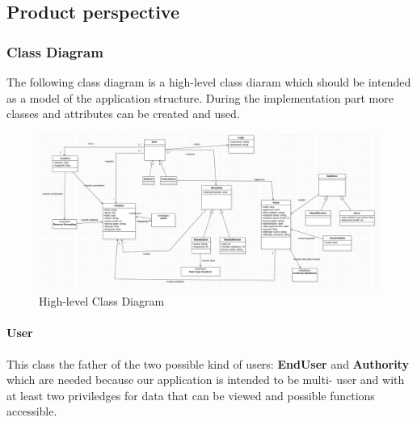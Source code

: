 



\subsection{Product perspective }

\subsubsection{Class Diagram}
The following class diagram is a high-level class diaram which should be intended as a model of the application structure. During the implementation part more classes and attributes can be created and used.


\begin{figure}
\centering
\includegraphics[width=\textwidth]{Images/Class.png}
\caption{\label{fig:classdiagram}High-level Class Diagram}
\end{figure}



\paragraph{User}
This class the father of the two possible kind of users: \textbf{EndUser} and \textbf{Authority} which are needed because our application is intended to be multi- user and with at least two priviledges for data that can be viewed and possible functions accessible.
